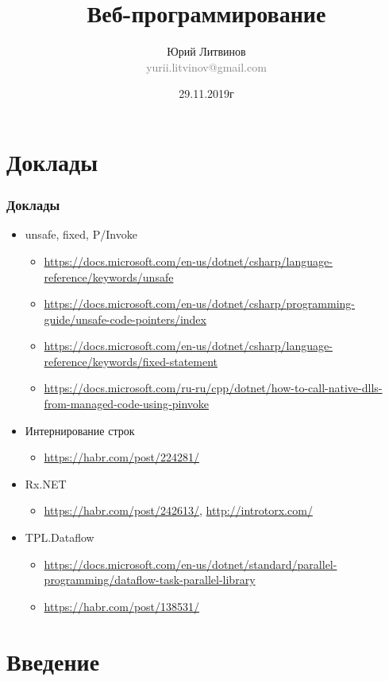 \documentclass[xetex,mathserif,serif]{beamer}
\title{Веб-программирование}
\author[Юрий Литвинов]{Юрий Литвинов\\\small{\textcolor{gray}{yurii.litvinov@gmail.com}}}
\date{29.11.2019г}
\begin{document}
	\frame{\titlepage}

	\section{Доклады}

	\begin{frame}
		\frametitle{Доклады}
		\begin{itemize}
			\item unsafe, fixed, P/Invoke
			\begin{itemize}
				\item \url{https://docs.microsoft.com/en-us/dotnet/csharp/language-reference/keywords/unsafe}
				\item \url{https://docs.microsoft.com/en-us/dotnet/csharp/programming-guide/unsafe-code-pointers/index}
				\item \url{https://docs.microsoft.com/en-us/dotnet/csharp/language-reference/keywords/fixed-statement}
				\item \url{https://docs.microsoft.com/ru-ru/cpp/dotnet/how-to-call-native-dlls-from-managed-code-using-pinvoke}
			\end{itemize}
			\item Интернирование строк
			\begin{itemize}
				\item \url{https://habr.com/post/224281/}
			\end{itemize}
			\item Rx.NET
			\begin{itemize}
				\item \url{https://habr.com/post/242613/}, \url{http://introtorx.com/}
			\end{itemize}
			\item TPL.Dataflow
			\begin{itemize}
				\item \url{https://docs.microsoft.com/en-us/dotnet/standard/parallel-programming/dataflow-task-parallel-library}
				\item \url{https://habr.com/post/138531/}
			\end{itemize}
		\end{itemize}
	\end{frame}

	\section{Введение}
\end{document}

